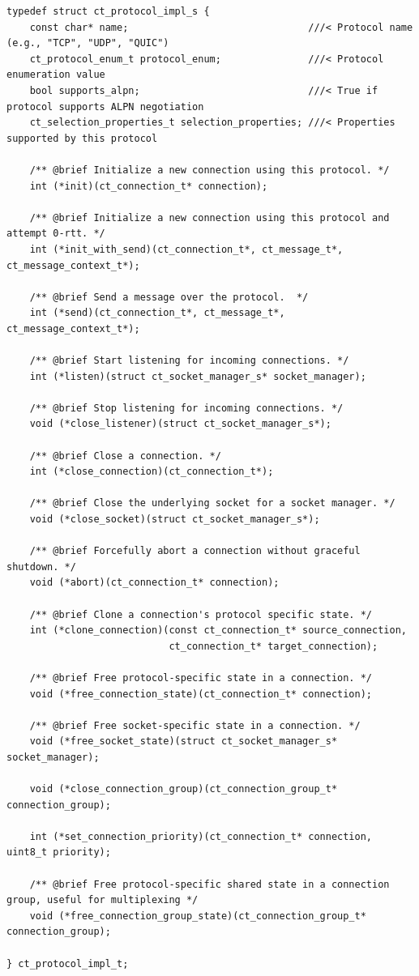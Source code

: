 \begin{listing}[htbp]
\begin{verbatim}
typedef struct ct_protocol_impl_s {
    const char* name;                               ///< Protocol name (e.g., "TCP", "UDP", "QUIC")
    ct_protocol_enum_t protocol_enum;               ///< Protocol enumeration value
    bool supports_alpn;                             ///< True if protocol supports ALPN negotiation
    ct_selection_properties_t selection_properties; ///< Properties supported by this protocol

    /** @brief Initialize a new connection using this protocol. */
    int (*init)(ct_connection_t* connection);

    /** @brief Initialize a new connection using this protocol and attempt 0-rtt. */
    int (*init_with_send)(ct_connection_t*, ct_message_t*, ct_message_context_t*);

    /** @brief Send a message over the protocol.  */
    int (*send)(ct_connection_t*, ct_message_t*, ct_message_context_t*);

    /** @brief Start listening for incoming connections. */
    int (*listen)(struct ct_socket_manager_s* socket_manager);

    /** @brief Stop listening for incoming connections. */
    void (*close_listener)(struct ct_socket_manager_s*);

    /** @brief Close a connection. */
    int (*close_connection)(ct_connection_t*);

    /** @brief Close the underlying socket for a socket manager. */
    void (*close_socket)(struct ct_socket_manager_s*);

    /** @brief Forcefully abort a connection without graceful shutdown. */
    void (*abort)(ct_connection_t* connection);

    /** @brief Clone a connection's protocol specific state. */
    int (*clone_connection)(const ct_connection_t* source_connection,
                            ct_connection_t* target_connection);

    /** @brief Free protocol-specific state in a connection. */
    void (*free_connection_state)(ct_connection_t* connection);

    /** @brief Free socket-specific state in a connection. */
    void (*free_socket_state)(struct ct_socket_manager_s* socket_manager);

    void (*close_connection_group)(ct_connection_group_t* connection_group);

    int (*set_connection_priority)(ct_connection_t* connection, uint8_t priority);

    /** @brief Free protocol-specific shared state in a connection group, useful for multiplexing */
    void (*free_connection_group_state)(ct_connection_group_t* connection_group);

} ct_protocol_impl_t;
\end{verbatim}
\caption[Generic protocol interface]{Generic protocol interface used internally in CTaps. The QUIC implementation
of this interface can be seen in \cref{lst:quic-impl-struct}.}
\label{lst:impl-struct}
\end{listing}

